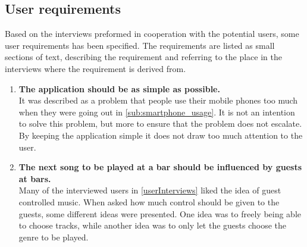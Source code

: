 \subsection{User requirements}
\label{sub:user_requirements}

Based on the interviews preformed in cooperation with the potential users, some user requirements has been specified. The requirements are listed as small sections of text, describing the requirement and referring to the place in the interviews where the requirement is derived from.

\begin{enumerate}
    \item \textbf{The application should be as simple as possible.}\\
        It was described as a problem that people use their mobile phones too much when they were going out in \cref{sub:smartphone_usage}. It is not an intention to solve this problem, but more to ensure that the problem does not escalate. By keeping the application simple it does not draw too much attention to the user.
    \item \textbf{The next song to be played at a bar should be influenced by guests at bars.} \\
      Many of the interviewed users in \cref{userInterviews} liked the idea of guest controlled music. When asked how much control should be given to the guests, some different ideas were presented. One idea was to freely being able to choose tracks, while another idea was to only let the guests choose the genre to be played.
\end{enumerate}
